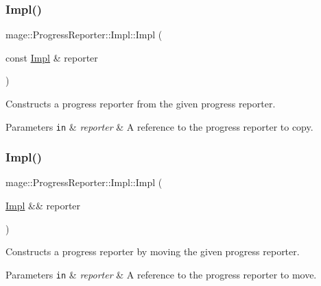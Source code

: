 \subsubsection{\texorpdfstring{Impl()}{Impl()}\hspace{0.1cm}{\footnotesize\ttfamily [2/3]}}
{\footnotesize\ttfamily mage\+::\+Progress\+Reporter\+::\+Impl\+::\+Impl (\begin{DoxyParamCaption}\item[{const \hyperlink{classmage_1_1_progress_reporter_1_1_impl}{Impl} \&}]{reporter }\end{DoxyParamCaption})\hspace{0.3cm}{\ttfamily [delete]}}

Constructs a progress reporter from the given progress reporter.


\begin{DoxyParams}[1]{Parameters}
\mbox{\tt in}  & {\em reporter} & A reference to the progress reporter to copy. \\
\hline
\end{DoxyParams}
\hypertarget{classmage_1_1_progress_reporter_1_1_impl_ab3b6811ed80a087ac10c90e97730147c}{}\label{classmage_1_1_progress_reporter_1_1_impl_ab3b6811ed80a087ac10c90e97730147c} 
\subsubsection{\texorpdfstring{Impl()}{Impl()}\hspace{0.1cm}{\footnotesize\ttfamily [3/3]}}
{\footnotesize\ttfamily mage\+::\+Progress\+Reporter\+::\+Impl\+::\+Impl (\begin{DoxyParamCaption}\item[{\hyperlink{classmage_1_1_progress_reporter_1_1_impl}{Impl} \&\&}]{reporter }\end{DoxyParamCaption})\hspace{0.3cm}{\ttfamily [noexcept]}}

Constructs a progress reporter by moving the given progress reporter.


\begin{DoxyParams}[1]{Parameters}
\mbox{\tt in}  & {\em reporter} & A reference to the progress reporter to move. \\
\hline
\end{DoxyParams}
\hypertarget{classmage_1_1_progress_reporter_1_1_impl_af5dbbaa059fdfc22e90e274ba14053a8}{}\label{classmage_1_1_progress_reporter_1_1_impl_af5dbbaa059fdfc22e90e274ba14053a8} 
